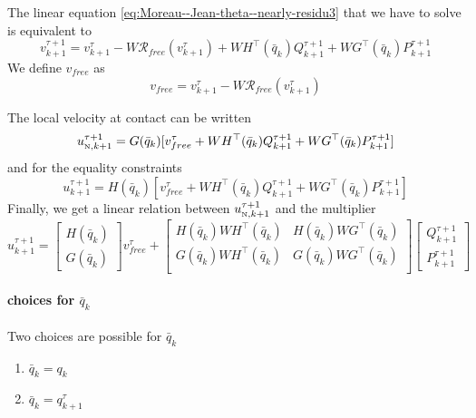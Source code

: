 The linear equation \ref{eq:Moreau--Jean-theta--nearly-residu3} that we have to solve is equivalent to
\begin{equation}
  \label{eq:13}
  \boxed{v^{\tau+1}_{k+1} = v^{\tau}_{k+1} - W  \mathcal R_{free}(v^\tau_{k+1}) + W   H^\top(\bar q_k) Q^{\tau+1}_{k+1} + W G^\top(\bar q_k) P^{\tau+1}_{k+1}}
\end{equation}
We define  $v_{free}$ as
\begin{equation}
  \label{eq:15}
  v_{free}  = v^{\tau}_{k+1} - W  \mathcal R_{free}(v^\tau_{k+1})
\end{equation}

The local velocity at contact can be written
\begin{equation}
  \label{eq:14}
  u^{\tau+1}_{{\hbox{\tiny{N}}},k+1} = G(\bar q_k) [  v_{free}^{\tau} + W   H^\top(\bar q_k) Q^{\tau+1}_{k+1} + W G^\top(\bar q_k) P^{\tau+1}_{k+1}]
\end{equation}
and for the equality constraints
\begin{equation}
  \label{eq:14}
  u^{\tau+1}_{k+1} = H(\bar q_k) [  v_{free}^{\tau} + W   H^\top(\bar q_k) Q^{\tau+1}_{k+1} + W G^\top(\bar q_k) P^{\tau+1}_{k+1}]
\end{equation}
Finally, we get a linear relation between $u^{\tau+1}_{{\hbox{\tiny{N}}},k+1}$ and the multiplier 
\begin{equation}
  \label{eq:16}
 \boxed{ u^{\tau+1}_{k+1} =
  \begin{bmatrix}
    H(\bar q_k) \\
    G(\bar q_k)
  \end{bmatrix} v_{free}^{\tau}
  +
  \begin{bmatrix}
    H(\bar q_k)W   H^\top(\bar q_k) & H(\bar q_k)W   G^\top(\bar q_k) \\
    G(\bar q_k)W   H^\top(\bar q_k) & G(\bar q_k)W   G^\top(\bar q_k) \\
  \end{bmatrix}
  \begin{bmatrix}
    Q^{\tau+1}_{k+1} \\
    P^{\tau+1}_{k+1}
  \end{bmatrix}}
\end{equation}






\paragraph{choices for $\bar q_k$} Two choices are possible for $\bar q_k$
\begin{enumerate}
\item $\bar q_k = q_k$
\item $\bar q_k = q^{\tau}_{k+1}$
\end{enumerate}

